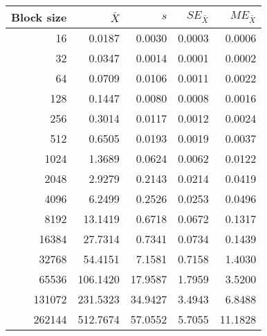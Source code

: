 \begin{tabular}{rrrrr}\toprule
{\small Block size} & $\bar{X}$ & $s$ & $SE_{\bar{X}}$ & $ME_{\bar{X}}$ \\\midrule
16 & 0.0187 & 0.0030 & 0.0003 & 0.0006\\
32 & 0.0347 & 0.0014 & 0.0001 & 0.0002\\
64 & 0.0709 & 0.0106 & 0.0011 & 0.0022\\
128 & 0.1447 & 0.0080 & 0.0008 & 0.0016\\
256 & 0.3014 & 0.0117 & 0.0012 & 0.0024\\
512 & 0.6505 & 0.0193 & 0.0019 & 0.0037\\
1024 & 1.3689 & 0.0624 & 0.0062 & 0.0122\\
2048 & 2.9279 & 0.2143 & 0.0214 & 0.0419\\
4096 & 6.2499 & 0.2526 & 0.0253 & 0.0496\\
8192 & 13.1419 & 0.6718 & 0.0672 & 0.1317\\
16384 & 27.7314 & 0.7341 & 0.0734 & 0.1439\\
32768 & 54.4151 & 7.1581 & 0.7158 & 1.4030\\
65536 & 106.1420 & 17.9587 & 1.7959 & 3.5200\\
131072 & 231.5323 & 34.9427 & 3.4943 & 6.8488\\
262144 & 512.7674 & 57.0552 & 5.7055 & 11.1828\\
\bottomrule
\end{tabular}
